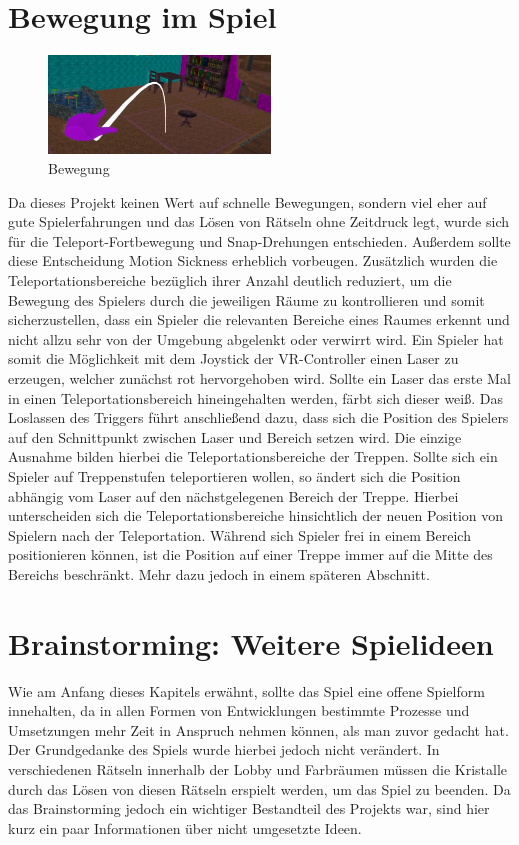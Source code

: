 \section{Bewegung im Spiel}
\begin{figure}
	\vspace*{-0.5cm}
	\includegraphics[width=5.9cm]{Pictures/Bewegung}
	\caption{Bewegung}
	\vspace*{-0.5cm}
	\label{fig:bewegung}
\end{figure}
Da dieses Projekt keinen Wert auf schnelle Bewegungen, sondern viel eher auf gute Spielerfahrungen und das Lösen von Rätseln ohne Zeitdruck legt, wurde sich für die Teleport-Fortbewegung und Snap-Drehungen entschieden. Außerdem sollte diese Entscheidung Motion Sickness erheblich vorbeugen. Zusätzlich wurden die Teleportationsbereiche bezüglich ihrer Anzahl deutlich reduziert, um die Bewegung des Spielers durch die jeweiligen Räume zu kontrollieren und somit sicherzustellen, dass ein Spieler die relevanten Bereiche eines Raumes erkennt und nicht allzu sehr von der Umgebung abgelenkt oder verwirrt wird. Ein Spieler hat somit die Möglichkeit mit dem Joystick der VR-Controller einen Laser zu erzeugen, welcher zunächst rot hervorgehoben wird. Sollte ein Laser das erste Mal in einen Teleportationsbereich hineingehalten werden, färbt sich dieser weiß. Das Loslassen des Triggers führt anschließend dazu, dass sich die Position des Spielers auf den Schnittpunkt zwischen Laser und Bereich setzen wird. Die einzige Ausnahme bilden hierbei die Teleportationsbereiche der Treppen. Sollte sich ein Spieler auf Treppenstufen teleportieren wollen, so ändert sich die Position abhängig vom Laser auf den nächstgelegenen Bereich der Treppe. Hierbei unterscheiden sich die Teleportationsbereiche hinsichtlich der neuen Position von Spielern nach der Teleportation. Während sich Spieler frei in einem Bereich positionieren können, ist die Position auf einer Treppe immer auf die Mitte des Bereichs beschränkt. Mehr dazu jedoch in einem späteren Abschnitt.

\section{Brainstorming: Weitere Spielideen}
Wie am Anfang dieses Kapitels erwähnt, sollte das Spiel eine offene Spielform innehalten, da in allen Formen von Entwicklungen bestimmte Prozesse und Umsetzungen mehr Zeit in Anspruch nehmen können, als man zuvor gedacht hat. Der Grundgedanke des Spiels wurde hierbei jedoch nicht verändert. In verschiedenen Rätseln innerhalb der Lobby und Farbräumen müssen die Kristalle durch das Lösen von diesen Rätseln erspielt werden, um das Spiel zu beenden. Da das Brainstorming jedoch ein wichtiger Bestandteil des Projekts war, sind hier kurz ein paar Informationen über nicht umgesetzte Ideen.
